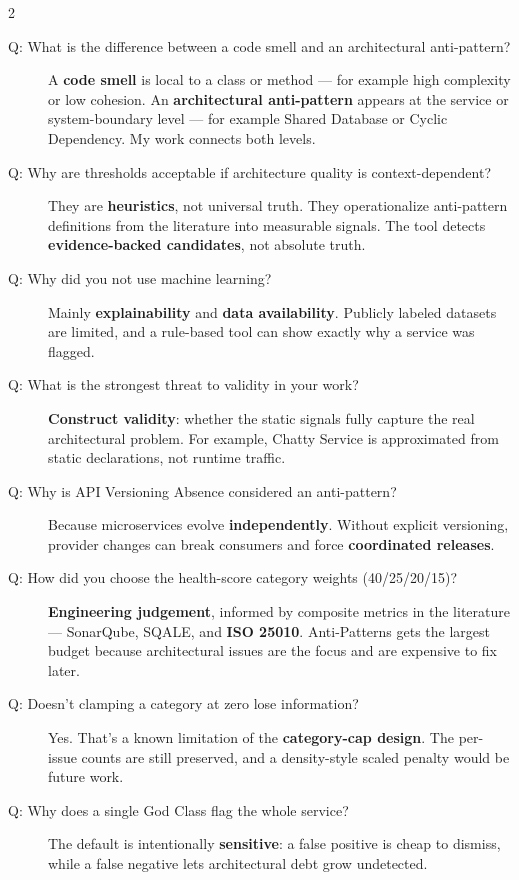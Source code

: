 \documentclass[10pt,a4paper]{article}
\begin{document}
\begin{multicols}{2}
\begin{description}
    \item[Q: What is the difference between a code smell and an architectural anti-pattern?]
    A \textbf{code smell} is local to a class or method --- for example high complexity or low cohesion. An \textbf{architectural anti-pattern} appears at the service or system-boundary level --- for example Shared Database or Cyclic Dependency. My work connects both levels.

    \item[Q: Why are thresholds acceptable if architecture quality is context-dependent?]
    They are \textbf{heuristics}, not universal truth. They operationalize anti-pattern definitions from the literature into measurable signals. The tool detects \textbf{evidence-backed candidates}, not absolute truth.

    \item[Q: Why did you not use machine learning?]
    Mainly \textbf{explainability} and \textbf{data availability}. Publicly labeled datasets are limited, and a rule-based tool can show exactly why a service was flagged.

    \item[Q: What is the strongest threat to validity in your work?]
    \textbf{Construct validity}: whether the static signals fully capture the real architectural problem. For example, Chatty Service is approximated from static declarations, not runtime traffic.

    \item[Q: Why is API Versioning Absence considered an anti-pattern?]
    Because microservices evolve \textbf{independently}. Without explicit versioning, provider changes can break consumers and force \textbf{coordinated releases}.

    \item[Q: How did you choose the health-score category weights (40/25/20/15)?]
    \textbf{Engineering judgement}, informed by composite metrics in the literature --- SonarQube, SQALE, and \textbf{ISO 25010}. Anti-Patterns gets the largest budget because architectural issues are the focus and are expensive to fix later.

    \item[Q: Doesn't clamping a category at zero lose information?]
    Yes. That's a known limitation of the \textbf{category-cap design}. The per-issue counts are still preserved, and a density-style scaled penalty would be future work.

    \item[Q: Why does a single God Class flag the whole service?]
    The default is intentionally \textbf{sensitive}: a false positive is cheap to dismiss, while a false negative lets architectural debt grow undetected.
\end{description}


\end{multicols}
\end{document}
